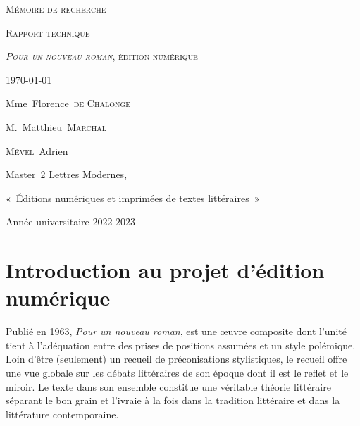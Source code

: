 \documentclass[12pt, a4paper]{article}
\begin{document}


\begin{titlepage}
  

\vspace*{3cm}

 
\begin{center}
\textsc{\huge Mémoire de recherche}

\textsc{\large Rapport technique}

\textsc{\textit{Pour un nouveau roman}, édition numérique}



\today


\vspace*{2cm}
Mme~Florence~\textsc{de Chalonge}


M.~Matthieu~\textsc{Marchal}




\vspace*{11cm}
\small
\textsc{Mével}~Adrien

Master~2 Lettres Modernes,

«~Éditions numériques et imprimées de textes littéraires~»

\vspace*{2.5cm}
Année universitaire 2022-2023




\end{center}


\end{titlepage} 

\newcommand{\punr}{\textit{Pour un nouveau roman}}
\newcommand{\robbe}{Alain~Robbe-Grillet}
\newcommand{\go}{«~}
\newcommand{\gf}{~»}




\vspace{3cm}
\section{Introduction au projet d'édition numérique}
Publié en 1963, \punr{}, est une œuvre composite dont l'unité tient à l'adéquation entre des prises de positions assumées et un style polémique. Loin d'être (seulement) un recueil de préconisations stylistiques, le recueil offre une vue globale sur les débats littéraires de son époque dont il est le reflet et le miroir. Le texte dans son ensemble constitue une véritable théorie littéraire séparant le bon grain et l'ivraie à la fois dans la tradition littéraire et dans la littérature contemporaine.
\end{document}
